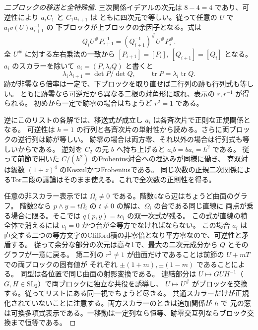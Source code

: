 \begin{proof}[二ブロックの移送と全特殊値]
三次関係イデアルの次元は $8-4=4$ であり、可逆性により $a_i C_1$ と $C_1 a_{i+1}$ は
ともに四次元で等しい。従って任意の $U$ で $a_i v(U)a_{i+1}^{-1}$ の
下ブロックが上ブロックの余因子となる。式は
\[
 Q_i U^\# P_{i+1}^{-1}
 =(Q_{i+1}^{-1})^\# U^\# P_i^\# .
\]
全 $U^\#$ に対する左右乗法の一致から $[P_{i+1}]=[P_i]$,
$[Q_{i+1}]=[Q_i]$ となる。$a_i$ のスカラーを除いて
$a_i=(P,\lambda_i Q)$ と書くと
\[
 \lambda_i\lambda_{i+1}=\det P/\det Q,\qquad
 \operatorname{tr}P=\lambda_i\operatorname{tr}Q.
\]
跡が非零なら倍率は一定で、下ブロックを取り直せば二行列の跡も行列式も等しい。
ともに跡零なら可逆だから異なる二根の対角形に取れ、表示の $r,r^{-1}$ が得られる。
初めから一定で跡零の場合はちょうど $r^2=1$ である。

逆にこのリストの各解では、移送式が成立し $a_i$ は各斉次片で正則な正規関係となる。
可逆性は $h=1$ の行列と各斉次片の単射性から読める。さらに両ブロックの逆行列は跡が等しい。
跡零の場合は両方零、それ以外の場合は行列式も等しいからである。
逆対を $C_2$ の元 $b$ へ持ち上げると $a_i b=b a_i=h^2$ である。
従って前節で用いた $C/(h^2)$ のFrobenius対合への埋込みが同様に働き、
商双対は級数 $(1+z)^4$ のKoszulかつFrobeniusである。
同じ次数の正規二次関係によるTor二段の議論はそのまま使える。これで全次数の正則性を得る。

任意の非スカラー表示では $\Omega_i\ne0$ である。階数4なら辺はちょうど曲面のグラフ。
階数2なら $p\wedge y=t\Omega_i$ の $t\ne0$ の解は、$\Omega_i$ の台である同じ直線に
両点が乗る場合に限る。そこでは $q(p,y)=t c_i$ の双一次式が残る。
この式が直線の積全体で消えるには $c_i=0$ かつ台が全等方でなければならない。
この場合 $a_i$ は直交する二つの等方文字のClifford積の非零倍となり平方零なので、可逆性と矛盾する。
従って余分な部分の次元は高々1で、最大の二次元成分から $Q$ とそのグラフが一意に戻る。
第二列の $r^2\ne1$ が曲面だけであることは前節の $U+mT$ での両ブロックの固有値が
それぞれ $\pm(1+m),\pm(1-m)$ であることによる。
同型は各位置で同じ曲面の射影変換である。
連結部分は $U\mapsto G U H^{-1}$（$G,H\in\mathrm{SL}_2$）で両ブロックに独立な共役を誘導し、
$U\mapsto U^\#$ がブロックを交換する。従ってリストにある同一視でちょうど尽きる。
共通スカラーだけが正規化されていないことに注意する。両方スカラーのときは追加関係が $h$ で
元の窓は可換多項式表示である。一移動は一定列なら恒等、跡零交互列ならブロック交換まで恒等である。
\end{proof}

